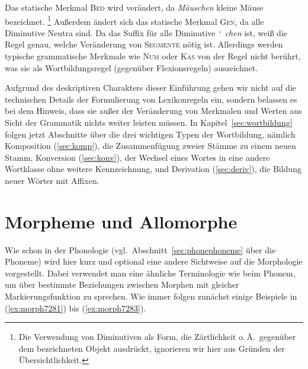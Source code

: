 \begin{exe}
\end{exe}

Das statische Merkmal \textsc{Bed} wird verändert, da \textit{Mäuschen} kleine Mäuse bezeichnet.%
\footnote{Die Verwendung von Diminutiven als Form, die Zärtlichkeit o.\,Ä.\ gegenüber dem bezeichneten Objekt ausdrückt, ignorieren wir hier aus Gründen der Übersichtlichkeit.}
Außerdem ändert sich das statische Merkmal \textsc{Gen}, da alle Diminutive Neutra sind.
Da das Suffix für alle Diminutive \mbox{\textit{\char`~chen}} ist, weiß die Regel genau, welche Veränderung von \textsc{Segmente} nötig ist.
Allerdings werden typische grammatische Merkmale wie \textsc{Num} oder \textsc{Kas} von der Regel nicht berührt, was sie als Wortbildungsregel (gegenüber Flexionsregeln) auszeichnet.

Aufgrund des deskriptiven Charakters dieser Einführung gehen wir nicht auf die technischen Details der Formulierung von Lexikonregeln ein, sondern belassen es bei dem Hinweis, dass sie außer der Veränderung von Merkmalen und Werten aus Sicht der Grammatik nichts weiter leisten müssen.
In Kapitel~\ref{sec:wortbildung} folgen jetzt Abschnitte über die drei wichtigen Typen der Wortbildung, nämlich Komposition (\ref{sec:komp}), die Zusammenfügung zweier Stämme zu einem neuen Stamm, Konversion (\ref{sec:konv}), der Wechsel eines Wortes in eine andere Wortklasse ohne weitere Kennzeichnung, und Derivation (\ref{sec:deriv}), die Bildung neuer Wörter mit Affixen.


\section[Morpheme und Allomorphe]{\Opsional Morpheme und Allomorphe}

\label{sec:morphemeallomorphe}

Wie schon in der Phonologie (vgl.\ Abschnitt~\ref{sec:phonephoneme} über die Phoneme) wird hier kurz und optional eine andere Sichtweise auf die Morphologie vorgestellt.
Dabei verwendet man eine ähnliche Terminologie wie beim Phonem, um über bestimmte Beziehungen zwischen Morphen mit gleicher Markierungsfunktion zu sprechen.
Wie immer folgen zunächst einige Beispiele in (\ref{ex:morph7281}) bis (\ref{ex:morph7283}).

